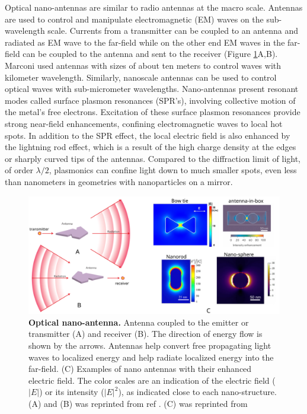 Optical nano-antennas are similar to radio antennas at the macro scale.
Antennas are used to control and manipulate electromagnetic (EM) waves on the sub-wavelength scale.
Currents from a transmitter can be coupled to an antenna and radiated as EM wave to the far-field while on the other end EM waves in the far-field can be coupled to the antenna and sent to the receiver (Figure \ref{fig:nano_antenna}A,B).
Marconi used antennas with sizes of about ten meters to control waves with kilometer wavelength. 
Similarly, nanoscale antennas can be used to control optical waves with sub-micrometer wavelengths.
Nano-antennas present resonant modes called surface plasmon resonances (SPR's), involving collective motion of the metal's free electrons.
Excitation of these surface plasmon resonances provide strong near-field enhancements, confining electromagnetic waves to local hot spots. \cite{bath8624,schuller2010plasmonics,ozbay2006plasmonics,maier2005plasmonics,hess2012active}
In addition to the SPR effect, the local electric field is also enhanced by the lightning rod effect, which is a result of the high charge density at the edges or sharply curved tips of the antennas.
Compared to the diffraction limit of light, of order $\lambda/2$, plasmonics can confine light down to much smaller spots, even less than nanometers in geometries with nanoparticles on a mirror\cite{benz2016singlemolecule}.
\begin{figure}
	\centering
	\includegraphics[width=\textwidth]{nano_antenna}
	\caption{\textbf{Optical nano-antenna.} Antenna coupled to the emitter or transmitter (A) and receiver (B). The direction of energy flow is shown by the arrows.
	Antennas help convert free propagating light waves to localized energy and help radiate localized energy into the far-field.
	(C) Examples of nano antennas with their enhanced electric field.
	The color scales are an indication of the electric field ($|E|$) or its intensity ($|E|^2$), as indicated close to each nano-structure. (A) and (B) was reprinted from ref \cite{novotny2011antennas}. (C) was reprinted from \cite{kinkhabwala2009large,punj2013a,khatua2014resonant}}
	\label{fig:nano_antenna}
\end{figure}

